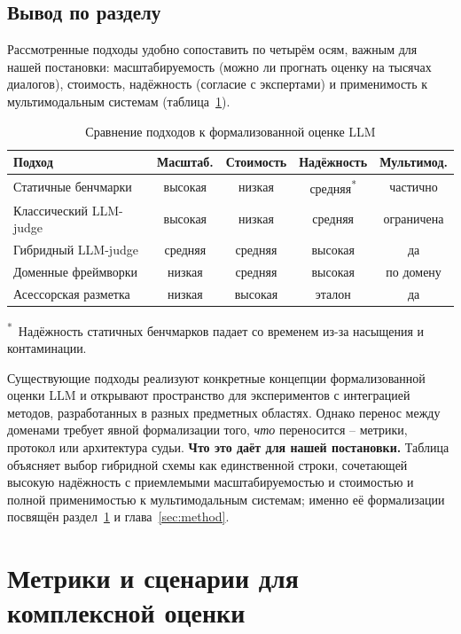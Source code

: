 \subsection{Вывод по разделу}

Рассмотренные подходы удобно сопоставить по четырём осям, важным для
нашей постановки: масштабируемость (можно ли прогнать оценку на тысячах
диалогов), стоимость, надёжность (согласие с экспертами) и применимость
к мультимодальным системам (таблица~\ref{tab:approaches-compare}).

\begin{table}[htbp]
    \centering
    \caption{Сравнение подходов к формализованной оценке LLM}
    \label{tab:approaches-compare}
    \begin{tabular}{lcccc}
        \toprule
        Подход & Масштаб. & Стоимость & Надёжность & Мультимод. \\
        \midrule
        Статичные бенчмарки & высокая & низкая & средняя\textsuperscript{*} & частично \\
        Классический LLM-judge & высокая & низкая & средняя & ограничена \\
        Гибридный LLM-judge & средняя & средняя & высокая & да \\
        Доменные фреймворки & низкая & средняя & высокая & по домену \\
        Асессорская разметка & низкая & высокая & эталон & да \\
        \bottomrule
    \end{tabular}
\end{table}

\noindent\footnotesize\textsuperscript{*}~Надёжность статичных бенчмарков
падает со временем из-за насыщения и контаминации.\normalsize

Существующие подходы реализуют конкретные концепции формализованной
оценки LLM и открывают пространство для экспериментов с интеграцией
методов, разработанных в разных предметных областях.
Однако перенос между доменами требует явной формализации того, \emph{что}
переносится -- метрики, протокол или архитектура судьи.
\textbf{Что это даёт для нашей постановки.} Таблица объясняет выбор
гибридной схемы как единственной строки, сочетающей высокую надёжность
с приемлемыми масштабируемостью и стоимостью и полной применимостью к
мультимодальным системам; именно её формализации посвящён
раздел~\ref{sec:related:metrics} и глава~\ref{sec:method}.

\section{Метрики и сценарии для комплексной оценки}
\label{sec:related:metrics}

